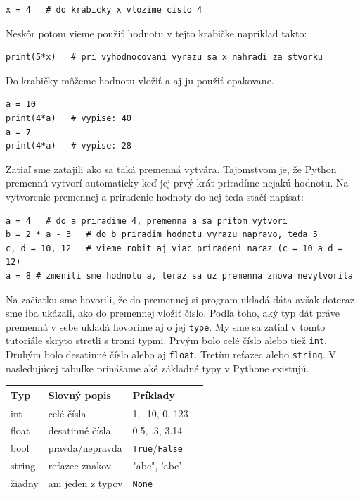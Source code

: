 \begin{lstlisting}
x = 4   # do krabicky x vlozime cislo 4
\end{lstlisting}

Neskôr potom vieme použiť hodnotu v tejto krabičke napríklad takto:

\begin{lstlisting}
print(5*x)   # pri vyhodnocovani vyrazu sa x nahradi za stvorku
\end{lstlisting}

Do krabičky môžeme hodnotu vložiť a aj ju použiť opakovane.

\begin{lstlisting}
a = 10
print(4*a)   # vypise: 40
a = 7
print(4*a)   # vypise: 28
\end{lstlisting}

Zatiaľ sme zatajili ako sa taká premenná vytvára. Tajomstvom je, že Python premennú vytvorí automaticky keď jej prvý krát priradíme nejakú hodnotu. Na vytvorenie premennej a priradenie hodnoty do nej teda stačí napísať:

\begin{lstlisting}
a = 4   # do a priradime 4, premenna a sa pritom vytvori
b = 2 * a - 3   # do b priradim hodnotu vyrazu napravo, teda 5
c, d = 10, 12   # vieme robit aj viac priradeni naraz (c = 10 a d = 12)
a = 8 # zmenili sme hodnotu a, teraz sa uz premenna znova nevytvorila
\end{lstlisting}

Na začiatku sme hovorili, že do premennej si program ukladá dáta avšak doteraz sme iba ukázali, ako do premennej vložiť číslo. Podľa toho, aký typ dát práve premenná v sebe ukladá hovoríme aj o jej \texttt{type}. My sme sa zatiaľ v tomto tutoriále skryto stretli s tromi typmi. Prvým bolo celé číslo alebo tiež \texttt{int}. Druhým bolo desatinné číslo alebo aj \texttt{float}. Tretím reťazec alebo \texttt{string}. V nasledujúcej tabuľke prinášame aké základné typy v Pythone existujú.

\smallskip
\begin{tabular}{|l|l|l|l|}
\hline
Typ & Slovný popis & Príklady \\ \hline
int & celé čísla & 1, -10, 0, 123 \\ \hline
float & desatinné čísla & 0.5, .3, 3.14  \\ \hline
bool & pravda/nepravda & \texttt{True}/\texttt{False} \\ \hline
string & reťazec znakov & "abc", 'abc' \\ \hline
žiadny & ani jeden z typov & \texttt{None} \\ \hline
\end{tabular}
\smallskip

